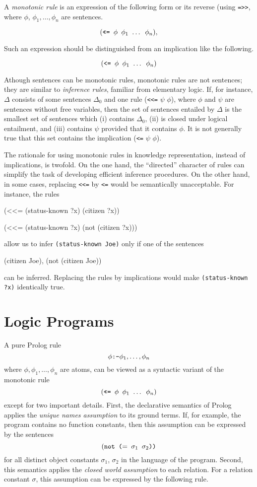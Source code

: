 A {\it monotonic rule} is an expression of the following form or its
reverse (using {\tt =>>}, where $\phi$, $\phi_1,\dots,\phi_n$ are
sentences.

$$(\hbox{\tt <<= $\phi$ $\phi_1$ $\dots$ $\phi_n$}),$$

Such an expression should be distinguished from an implication like
the following.

$$(\hbox{\tt <= $\phi$ $\phi_1$ $\dots$ $\phi_n$})$$

Athough sentences can be monotonic rules, monotonic rules are not
sentences; they are similar to {\it inference rules}, familiar from
elementary logic. If, for instance, $\Delta$ consists of some sentences
$\Delta_0$ and one rule ({\tt <<=} $\psi$ $\phi$), where $\phi$ and
$\psi$ are sentences without free variables, then the set of sentences
entailed by  $\Delta$ is the smallest set of sentences which (i)
contains $\Delta_0$, (ii) is closed under logical entailment, and (iii)
contains $\psi$ provided that it contains $\phi$.  It is not generally
true that this set contains the implication ({\tt <=} $\psi$ $\phi$).

The rationale for using monotonic rules in knowledge representation,
instead of implications, is twofold. On the one hand, the ``directed''
character of rules can simplify the task of developing efficient inference
procedures. On the other hand, in some cases, replacing {\tt <<=} by
{\tt <=} would be semantically unacceptable. For instance, the rules

\medskip
\beginverbatim
(<<= (status-known ?x) (citizen ?x))

(<<= (status-known ?x) (not (citizen ?x)))
\endverbatim
\medskip

\noindent
allow us to infer {\tt (status-known Joe)} only if one of the sentences

\medskip
\beginverbatim
(citizen Joe),  (not (citizen Joe))
\endverbatim
\medskip

\noindent
can be inferred.
Replacing the rules by implications would make {\tt (status-known ?x)}
identically true.

\section{Logic Programs}

A pure Prolog rule
$$\phi\hbox{\tt :-}\phi_1,\dots,\phi_n$$
where $\phi,\phi_1,\dots,\phi_n$ are atoms,
can be viewed as a syntactic variant of the monotonic rule
$$(\hbox{\tt <<= $\phi$ $\phi_1$ $\dots$ $\phi_n$})$$
except for two important details. First, the declarative semantics of
Prolog applies the {\it unique names assumption} to its ground
terms. If, for example, the program contains no function constants, then this
assumption can be expressed by the sentences
$$(\hbox{\tt not ($=$ $\sigma_1$ $\sigma_2$))}$$
for all distinct object constants $\sigma_1$, $\sigma_2$ in the language
of the program. Second, this semantics
applies the {\it closed world assumption} to each relation. For
a relation constant $\sigma$, this assumption can be expressed by the
following rule.

